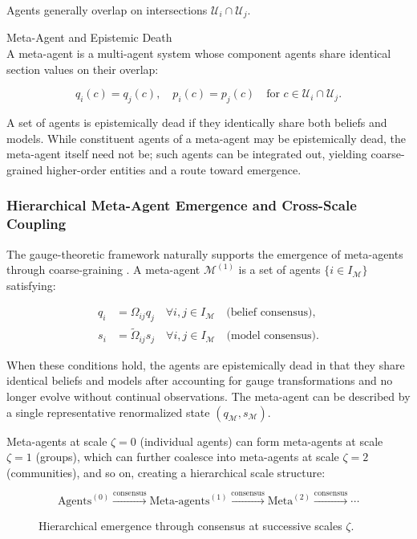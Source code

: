 \documentclass[twoside,11pt]{article}
\begin{document}
Agents generally overlap on intersections $\mathcal{U}_i \cap \mathcal{U}_j$.

Meta-Agent and Epistemic Death\\
A meta-agent is a multi-agent system whose component agents share identical section values on their overlap:

\begin{equation}
q_i(c) = q_j(c), \quad p_i(c) = p_j(c) \quad \text{for } c \in \mathcal{U}_i \cap \mathcal{U}_j.
\end{equation}

A set of agents is epistemically dead if they identically share both beliefs and models. While constituent agents of a meta-agent may be epistemically dead, the meta-agent itself need not be; such agents can be integrated out, yielding coarse-grained higher-order entities and a route toward emergence.

\subsubsection{Hierarchical Meta-Agent Emergence and Cross-Scale Coupling}
\label{sec:appendix_meta_agent}

The gauge-theoretic framework naturally supports the emergence of meta-agents through coarse-graining \citep{shen2008coarse}. A meta-agent $\mathcal{M}^{(1)}$ is a set of agents $\{i \in I_{\mathcal{M}}\}$ satisfying:

\begin{align}
q_i &= \Omega_{ij} q_j \quad \forall i,j \in I_{\mathcal{M}} \quad \text{(belief consensus)}, \label{eq:belief_consensus} \\
s_i &= \tilde{\Omega}_{ij} s_j \quad \forall i,j \in I_{\mathcal{M}} \quad \text{(model consensus)}. \label{eq:model_consensus}
\end{align}

When these conditions hold, the agents are epistemically dead in that they share identical beliefs and models after accounting for gauge transformations and no longer evolve without continual observations. The meta-agent can be described by a single representative renormalized state $(q_{\mathcal{M}}, s_{\mathcal{M}})$.

Meta-agents at scale $\zeta=0$ (individual agents) can form meta-agents at scale $\zeta=1$ (groups), which can further coalesce into meta-agents at scale $\zeta=2$ (communities), and so on, creating a hierarchical scale structure:

\begin{figure}[h]
\centering
\small
\[
\text{Agents}^{(0)} \xrightarrow{\text{consensus}}
\text{Meta-agents}^{(1)} \xrightarrow{\text{consensus}}
\text{Meta}^{(2)} \xrightarrow{\text{consensus}} \cdots
\]
\caption{Hierarchical emergence through consensus at successive scales $\zeta$.}
\label{fig:hierarchy}
\end{figure}
\end{document}
